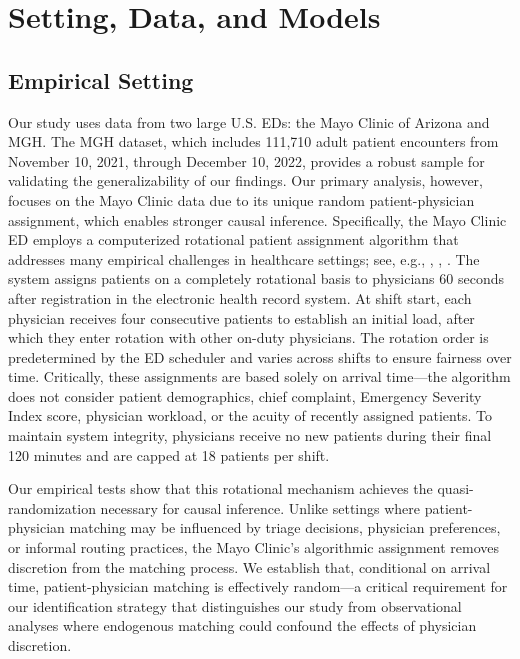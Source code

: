 \documentclass[,,blindrev]{informs}
\begin{document}
\section{Setting, Data, and Models}\label{sec:settingdata}

\subsection{Empirical Setting}\label{sec:setting}

Our study uses data from two large U.S. EDs: the Mayo Clinic of Arizona
and MGH. The MGH dataset, which includes 111,710 adult patient
encounters from November 10, 2021, through December 10, 2022, provides a
robust sample for validating the generalizability of our findings. Our
primary analysis, however, focuses on the Mayo Clinic data due to its
unique random patient-physician assignment, which enables stronger
causal inference. Specifically, the Mayo Clinic ED employs a
computerized rotational patient assignment algorithm that addresses many
empirical challenges in healthcare settings; see, e.g.,
\citet{Traub2016}, \citet{traub2016emergency}, \citet{Traub2018}. The
system assigns patients on a completely rotational basis to physicians
60 seconds after registration in the electronic health record system. At
shift start, each physician receives four consecutive patients to
establish an initial load, after which they enter rotation with other
on-duty physicians. The rotation order is predetermined by the ED
scheduler and varies across shifts to ensure fairness over time.
Critically, these assignments are based solely on arrival time---the
algorithm does not consider patient demographics, chief complaint,
Emergency Severity Index score, physician workload, or the acuity of
recently assigned patients. To maintain system integrity, physicians
receive no new patients during their final 120 minutes and are capped at
18 patients per shift.

Our empirical tests show that this rotational mechanism achieves the
quasi-randomization necessary for causal inference. Unlike settings
where patient-physician matching may be influenced by triage decisions,
physician preferences, or informal routing practices, the Mayo Clinic's
algorithmic assignment removes discretion from the matching process. We
establish that, conditional on arrival time, patient-physician matching
is effectively random---a critical requirement for our identification
strategy that distinguishes our study from observational analyses where
endogenous matching could confound the effects of physician discretion.
\end{document}
